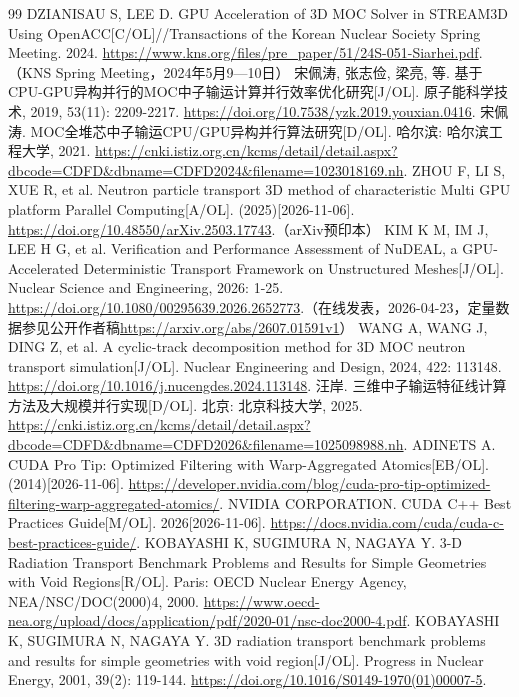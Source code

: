 \documentclass[UTF8, zihao=-4, fontset=none, a4paper]{ctexart}
\begin{document}
\begin{thebibliography}{99}
DZIANISAU S, LEE D. GPU Acceleration of 3D MOC Solver in STREAM3D Using OpenACC{[}C/OL{]}//Transactions of the Korean Nuclear Society Spring Meeting. 2024. \url{https://www.kns.org/files/pre_paper/51/24S-051-Siarhei.pdf}.（KNS Spring Meeting，2024年5月9—10日）
宋佩涛, 张志俭, 梁亮, 等. 基于CPU-GPU异构并行的MOC中子输运计算并行效率优化研究{[}J/OL{]}. 原子能科学技术, 2019, 53(11): 2209-2217. \url{https://doi.org/10.7538/yzk.2019.youxian.0416}.
宋佩涛. MOC全堆芯中子输运CPU/GPU异构并行算法研究{[}D/OL{]}. 哈尔滨: 哈尔滨工程大学, 2021. \url{https://cnki.istiz.org.cn/kcms/detail/detail.aspx?dbcode=CDFD&dbname=CDFD2024&filename=1023018169.nh}.
ZHOU F, LI S, XUE R, et al. Neutron particle transport 3D method of characteristic Multi GPU platform Parallel Computing{[}A/OL{]}. (2025)[2026-11-06]. \url{https://doi.org/10.48550/arXiv.2503.17743}.（arXiv预印本）
KIM K M, IM J, LEE H G, et al. Verification and Performance Assessment of NuDEAL, a GPU-Accelerated Deterministic Transport Framework on Unstructured Meshes{[}J/OL{]}. Nuclear Science and Engineering, 2026: 1-25. \url{https://doi.org/10.1080/00295639.2026.2652773}.（在线发表，2026-04-23，定量数据参见公开作者稿\url{https://arxiv.org/abs/2607.01591v1}）
WANG A, WANG J, DING Z, et al. A cyclic-track decomposition method for 3D MOC neutron transport simulation{[}J/OL{]}. Nuclear Engineering and Design, 2024, 422: 113148. \url{https://doi.org/10.1016/j.nucengdes.2024.113148}.
汪岸. 三维中子输运特征线计算方法及大规模并行实现{[}D/OL{]}. 北京: 北京科技大学, 2025. \url{https://cnki.istiz.org.cn/kcms/detail/detail.aspx?dbcode=CDFD&dbname=CDFD2026&filename=1025098988.nh}.
ADINETS A. CUDA Pro Tip: Optimized Filtering with Warp-Aggregated Atomics{[}EB/OL{]}. (2014)[2026-11-06]. \url{https://developer.nvidia.com/blog/cuda-pro-tip-optimized-filtering-warp-aggregated-atomics/}.
NVIDIA CORPORATION. CUDA C++ Best Practices Guide{[}M/OL{]}. 2026[2026-11-06]. \url{https://docs.nvidia.com/cuda/cuda-c-best-practices-guide/}.
KOBAYASHI K, SUGIMURA N, NAGAYA Y. 3-D Radiation Transport Benchmark Problems and Results for Simple Geometries with Void Regions{[}R/OL{]}. Paris: OECD Nuclear Energy Agency, NEA/NSC/DOC(2000)4, 2000. \url{https://www.oecd-nea.org/upload/docs/application/pdf/2020-01/nsc-doc2000-4.pdf}.
KOBAYASHI K, SUGIMURA N, NAGAYA Y. 3D radiation transport benchmark problems and results for simple geometries with void region{[}J/OL{]}. Progress in Nuclear Energy, 2001, 39(2): 119-144. \url{https://doi.org/10.1016/S0149-1970(01)00007-5}.

\end{thebibliography}
\end{document}

